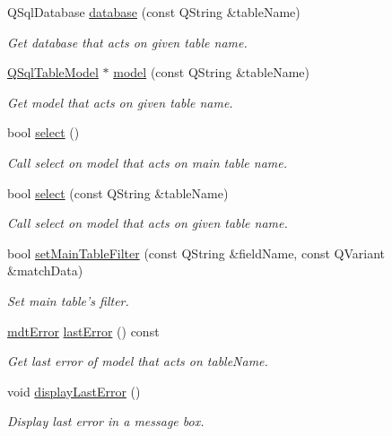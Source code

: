 \begin{DoxyCompactItemize}
Q\-Sql\-Database \hyperlink{classmdt_sql_form_aa9c2ce2607760a8ebebf3d88779637d4}{database} (const Q\-String \&table\-Name)
\begin{DoxyCompactList}\small\item\em Get database that acts on given table name. \end{DoxyCompactList}\item 
\hyperlink{class_q_sql_table_model}{Q\-Sql\-Table\-Model} $\ast$ \hyperlink{classmdt_sql_form_ac3f257a2711f66b3cdd811804c0f11b0}{model} (const Q\-String \&table\-Name)
\begin{DoxyCompactList}\small\item\em Get model that acts on given table name. \end{DoxyCompactList}\item 
bool \hyperlink{classmdt_sql_form_a2a2f564fe934cc8997b07f90abb771e1}{select} ()
\begin{DoxyCompactList}\small\item\em Call select on model that acts on main table name. \end{DoxyCompactList}\item 
bool \hyperlink{classmdt_sql_form_ae9a1f8c03e5ac8ccd01fa804356abd01}{select} (const Q\-String \&table\-Name)
\begin{DoxyCompactList}\small\item\em Call select on model that acts on given table name. \end{DoxyCompactList}\item 
bool \hyperlink{classmdt_sql_form_abfc6d7f49debf02f5016923cbd422f2f}{set\-Main\-Table\-Filter} (const Q\-String \&field\-Name, const Q\-Variant \&match\-Data)
\begin{DoxyCompactList}\small\item\em Set main table's filter. \end{DoxyCompactList}\item 
\hyperlink{classmdt_error}{mdt\-Error} \hyperlink{classmdt_sql_form_a04724293298421c404e93c58015cda5e}{last\-Error} () const 
\begin{DoxyCompactList}\small\item\em Get last error of model that acts on table\-Name. \end{DoxyCompactList}\item 
void \hyperlink{classmdt_sql_form_a7521d231f24663ee1d2acb904387353b}{display\-Last\-Error} ()
\begin{DoxyCompactList}\small\item\em Display last error in a message box. \end{DoxyCompactList}\item 

\end{DoxyCompactItemize}
